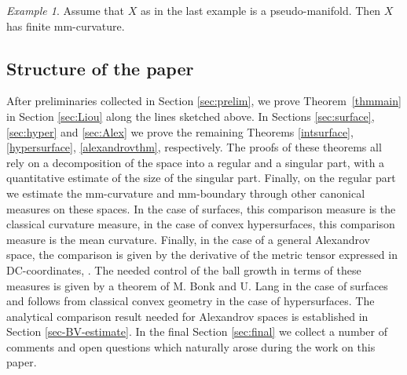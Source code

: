 \documentclass[12pt,leqno]{amsart}
\numberwithin{equation}{section}
\theoremstyle{definition}
\theoremstyle{remark}
\newtheorem{ex}[thm]{Example}
\newcommand{\tref}[1]{Theorem~\ref{#1}}
\begin{document}
 \begin{ex}  \label{ex:last}
 Assume that $X$   as in the last example   is a pseudo-manifold.
Then $X$ has finite mm-curvature.
 \end{ex}



\subsection{Structure of the paper}
After preliminaries collected in Section \ref{sec:prelim}, we prove \tref{thmmain} in Section \ref{sec:Liou} along the lines sketched above.
In Sections \ref{sec:surface}, \ref{sec:hyper}  and \ref{sec:Alex} we prove  the remaining Theorems \ref{intsurface}, \ref{hypersurface}, \ref{alexandrovthm}, respectively. The proofs of these theorems all rely on a decomposition of the space into a regular and a singular part, with
a quantitative estimate of the size of the singular part. Finally, on the regular part we estimate the mm-curvature and mm-boundary through other
canonical measures  on these spaces. In the case of surfaces, this comparison measure is the classical curvature measure,  in the case of convex hypersurfaces, this comparison measure is the mean curvature.  Finally, in the case of a general  Alexandrov space, the comparison is given by the derivative of the metric tensor  expressed in
DC-coordinates, \cite{Per-DC}. The needed control of the ball growth
in terms of these measures is given by a theorem of M. Bonk  and U. Lang in the case of surfaces  and follows from classical convex geometry in the case of hypersurfaces. The analytical comparison result  needed for Alexandrov spaces is established in Section \ref{sec-BV-estimate}. In the final
Section \ref{sec:final} we collect a number of comments and  open questions which naturally arose during the work on this paper.
\end{document}
